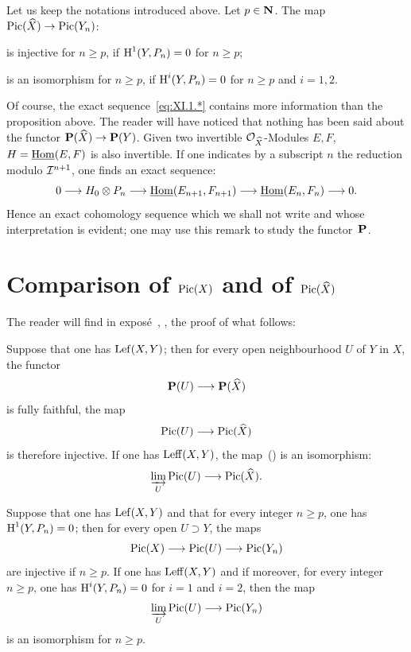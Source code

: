 \begin{proposition} \label{XI.1.1} Let us keep the notations introduced above. Let $p\in\mathbf{N}$. The map $\Pic(\hat X)\to \Pic(Y_n)$:
\begin{enumeratei}
\item
is injective for $n\geq p$, if $\operatorname{H}^1(Y, P_n)=0$ for $n\geq p$;
\item
is an isomorphism for $n\geq p$, if $\operatorname{H}^i(Y, P_n)=0$ for $n\geq p$ and $i=1, 2$.
\end{enumeratei}
\end{proposition}

Of course, the exact sequence~\eqref{eq:XI.1.*} contains more information than the proposition above. The reader will have noticed that nothing has been said about the functor $\PP(\hat X)\to\PP(Y)$. Given two invertible ${\mathcal O}_{\widehat X}$-Modules $E, F$, $H=\operatorname{\underline{Hom}}(E, F)$ is also invertible. If one indicates by a subscript $n$ the reduction modulo ${\mathcal I}^{n+1}$, one finds an exact sequence:
\[
0\to H_0\otimes P_n \to \SheafHom(E_{n+1}, F_{n+1}) \to \SheafHom(E_n, F_n)\to 0{\quoi}.
\]
Hence an exact cohomology sequence which we shall not write and whose interpretation is evident; one may use this remark to study the functor~${\mathbf P}$.

\section{Comparison of $\operatorname{Pic}(X)$ and of $\operatorname{Pic}(\widehat X)$} \label{XI.2}

The reader will find in expos\'e~, \numero {}, the proof of what follows:

\begin{proposition} \label{XI.2.1} Suppose that one has $\operatorname{Lef}(X, Y)$; then for every open neighbourhood $U$ of $Y$ in $X$, the functor
\begin{equation} \label{eq:XI.2.1} \PP(U)\to\PP(\hat X)
\end{equation}
is fully faithful, the map
\begin{equation} \label{eq:XI.2.2} \Pic(U)\to\Pic(\hat X)
\end{equation}
is therefore injective. If one has $\operatorname{Leff}(X, Y)$, the map~() is an isomorphism:
\begin{equation} \label{eq:XI.2.3}
\varinjlim_U\Pic(U)\to\Pic(\hat X){\quoi}.
\end{equation}
\end{proposition}

\begin{corollary} \label{XI.2.2} Suppose that one has $\operatorname{Lef}(X, Y)$ and that for every integer $n\geq p$, one has $\operatorname{H}^1(Y, P_n)=0$; then for every open $U\supset Y$, the maps
\[
\Pic(X)\to\Pic(U)\to\Pic(Y_n)
\]
are injective if $n\geq p$. If one has $\operatorname{Leff}(X, Y)$ and if moreover, for every integer $n\geq p$, one has $\operatorname{H}^i(Y, P_n)=0$ for $i=1$ and $i=2$, then the map
\[
\varinjlim_U\Pic(U)\to\Pic(Y_n)
\]
is an isomorphism for $n\geq p$.
\end{corollary}

